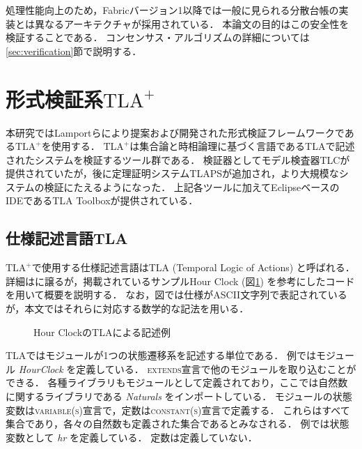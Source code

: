 \documentclass{fose2019}           %
\newcommand{\TLA}{$\text{TLA}^{+}$}
\begin{document}
処理性能向上のため，Fabricバージョン1以降では一般に見られる分散台帳の実装とは異なるアーキテクチャが採用されている．
本論文の目的はこの安全性を検証することである．
コンセンサス・アルゴリズムの詳細については\ref{sec:verification}節で説明する．

\section{形式検証系\TLA}
\label{sec:tla}

\newcommand{\s}[1]{\mathbf{S_{#1}}}
\newcommand{\p}[1]{\langle #1 \rangle}
\newcommand{\ra}{\Rightarrow}


本研究ではLamportらにより提案および開発された形式検証フレームワークである\TLA\cite{tla}を使用する．
\TLA は集合論と時相論理に基づく言語であるTLAで記述されたシステムを検証するツール群である．
検証器としてモデル検査器TLCが提供されていたが，後に定理証明システムTLAPSが追加され，より大規模なシステムの検証にたえるようになった．
上記各ツールに加えてEclipseベースのIDEであるTLA Toolboxが提供されている．

\subsection{仕様記述言語TLA}
\TLA で使用する仕様記述言語はTLA (Temporal Logic of Actions) と呼ばれる．
詳細は\cite{tla}に譲るが，掲載されているサンプルHour Clock (図\ref{fig:hc}) を参考にしたコードを用いて概要を説明する．
なお，図では仕様がASCII文字列で表記されているが，本文ではそれらに対応する数学的な記法を用いる．
\begin{figure}[tbh]
\centering
\begin{minipage}{0.95\linewidth}

\caption{Hour ClockのTLAによる記述例}\label{fig:hc}
\end{minipage}
\end{figure}

TLAではモジュールが1つの状態遷移系を記述する単位である．
例ではモジュール \textit{HourClock} を定義している．
\textsc{extends}宣言で他のモジュールを取り込むことができる．
各種ライブラリもモジュールとして定義されており，ここでは自然数に関するライブラリである \textit{Naturals} をインポートしている．
モジュールの状態変数は\textsc{variable(s)}宣言で，定数は\textsc{constant(s)}宣言で定義する．
これらはすべて集合であり，各々の自然数も定義された集合であるとみなされる．
例では状態変数として \textit{hr} を定義している．
定数は定義していない．
\end{document}
